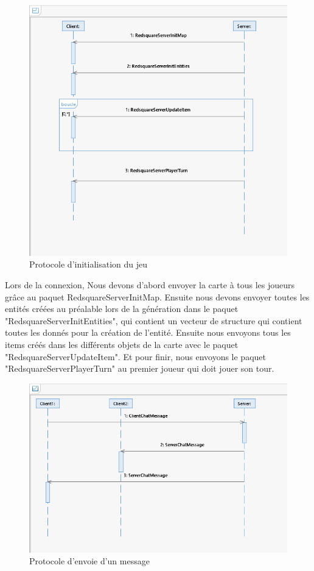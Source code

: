 \documentclass[a4paper, 12pt, twoside]{article}
\begin{document}
\begin{figure}[H]
    \includegraphics[scale=0.65]{./Diagramme/Jeu}
    \caption{Protocole d'initialisation du jeu}
\end{figure}
Lors de la connexion, Nous devons d'abord envoyer la carte à tous les joueurs grâce au paquet RedsquareServerInitMap. Ensuite nous devons envoyer toutes les entités créées au préalable lors de la génération dans le paquet "RedsquareServerInitEntities", qui contient un vecteur de structure qui contient toutes les donnés pour la création de l'entité. Ensuite nous envoyons tous les items créés dans les différents objets de la carte avec le paquet "RedsquareServerUpdateItem". Et pour finir, nous envoyons le paquet "RedsquareServerPlayerTurn" au premier joueur qui doit jouer son tour.
\newpage
\begin{figure}[H]
    \includegraphics[scale=0.7]{./Diagramme/Chat}
    \caption{Protocole d'envoie d'un message}
\end{figure}
\end{document}
